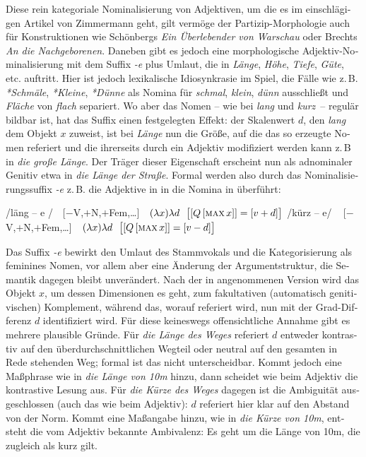 \documentclass[output=paper,colorlinks,citecolor=brown]{langscibook}
\begin{document}
\begin{otherlanguage}{german}
Diese rein kategoriale Nominalisierung von Adjektiven, um die es im einschlägigen Artikel von Zimmermann geht, gilt vermöge der Partizip-Morphologie auch für Konstruktionen wie Schönbergs \textit{Ein Über\-lebender von Warschau} oder Brechts \textit{An die Nachgeborenen}. Daneben gibt es jedoch eine morpho\-logische Ad\-jek\-tiv-No\-mi\-na\-li\-sierung mit dem Suffix \textit{-e} plus Umlaut, die in \textit{Länge}, \textit{Höhe}, \textit{Tiefe}, \textit{Güte}, etc. auftritt. Hier ist jedoch lexikalische Idiosynkrasie im Spiel, die Fälle wie z.\,B. \textit{*Schmäle}, \textit{*Kleine}, \textit{*Dünne} als Nomina für \textit{schmal}, \textit{klein}, \textit{dünn} ausschließt und \textit{Fläche} von \textit{flach} separiert. Wo aber das Nomen -- wie bei \textit{lang} und \mbox{\textit{kurz} --} regulär bildbar ist, hat das Suffix einen festgelegten Effekt: der Skalenwert $d$, den \textit{lang} dem Objekt $x$ zuweist, ist bei \textit{Länge} nun die Größe, auf die das so erzeugte Nomen referiert und die ihrerseits durch ein Adjektiv modifiziert werden kann z.\,B in \textit{die große Länge}. Der Träger dieser Eigenschaft erscheint nun als adnominaler Genitiv etwa in \textit{die Länge der Straße}. Formal werden also durch das Nominalisierungs\-suffix \textit{-e} z.\,B. die Adjektive in  in die Nomina in  überführt:

\ea
\ea /läng -- e / \,\, [$-$V,$+$N,$+$Fem,\dots] \,\, $(\lambda x) \lambda d \,\,\,\, \big\lbrack [ Q\, [ \textsc{max}\, x ]] = [v + d ]\big\rbrack$ 
\ex /kürz -- e/ \,\,\, [$-$V,$+$N,$+$Fem,\dots] \,\, $(\lambda x) \lambda d \,\,\,\, \big\lbrack [ Q\, [ \textsc{max}\, x ]] = [v - d ]\big\rbrack$
\z
\label{ex:22}
\z

\noindent Das Suffix \textit{-e} bewirkt den Umlaut des Stammvokals und die Kategorisierung als feminines Nomen, vor allem aber eine Änderung der Argumentstruktur, die Semantik dagegen bleibt unverändert. Nach der in  angenommenen Version wird das Objekt $x$, um dessen Dimensionen es geht, zum fakultativen (automatisch genitivischen) Komplement, während das, worauf referiert wird, nun mit der Grad-Differenz $d$ identifiziert wird. Für diese keineswegs offensichtliche Annahme gibt es mehrere plausible Gründe. Für \textit{die Länge des Weges} referiert $d$ entweder kontrastiv auf den überdurchschnittlichen Wegteil oder neutral auf den gesamten in Rede stehenden Weg; formal ist das nicht unterscheidbar. Kommt jedoch eine Maßphrase wie in \textit{die Länge von 10m} hinzu, dann scheidet wie beim Adjektiv die kontrastive Lesung aus. Für \textit{die Kürze des Weges} dagegen ist die Ambiguität ausgeschlossen (auch das wie beim Adjektiv): $d$ referiert hier klar auf den Abstand von der Norm. Kommt eine Maßangabe hinzu, wie in \textit{die Kürze von 10m}, entsteht die vom Adjektiv bekannte Ambivalenz: Es geht um die Länge von 10m, die zugleich als kurz gilt.


\end{otherlanguage}
\end{document}
